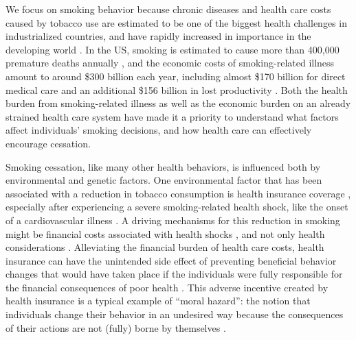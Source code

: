 \documentclass[11pt]{article}
\begin{document}
We focus on smoking behavior because chronic diseases and health care costs caused by tobacco use are estimated to be one of the biggest health challenges in industrialized countries, and have rapidly increased in importance in the developing world \citep{USDHHS2014,Goodchild2018}.
In the US, smoking is estimated to cause more than 400,000 premature deaths annually \citep{Ma2018}, and the economic costs of smoking-related illness amount to around \$300 billion each year, including almost \$170 billion for direct medical care and an additional \$156 billion in lost productivity \citep{USDHHS2014, Xu2015}.
Both the health burden from smoking-related illness as well as the economic burden on an already strained health care system have made it a priority to understand what factors affect individuals' smoking decisions, and how health care can effectively encourage cessation.

Smoking cessation, like many other health behaviors, is influenced both by environmental and genetic factors.
One environmental factor that has been associated with a reduction in tobacco consumption is health insurance coverage \citep{Dave2009,Richards2014,Marti2017}, especially after experiencing a severe smoking-related health shock, like the onset of a cardiovascular illness \citep{Wray1998,Clark2002,Falba2005,Khwaja2006learn,Keenan2009,Sundmacher2012}.
A driving mechanisms for this reduction in smoking might be financial costs associated with health shocks \citep{Richards2014,Marti2017}, and not only health considerations \citep{Smith2001,Clark2002,Khwaja2006spouse,Khwaja2006learn}.
Alleviating the financial burden of health care costs, health insurance can have the unintended side effect of preventing beneficial behavior changes that would have taken place if the individuals were fully responsible for the financial consequences of poor health \citep{Marti2017}.
This adverse incentive created by health insurance is a typical example of ``moral hazard'': the notion that individuals change their behavior in an undesired way because the consequences of their actions are not (fully) borne by themselves \citep{Einav2018,Zweifel2000}.
\end{document}
